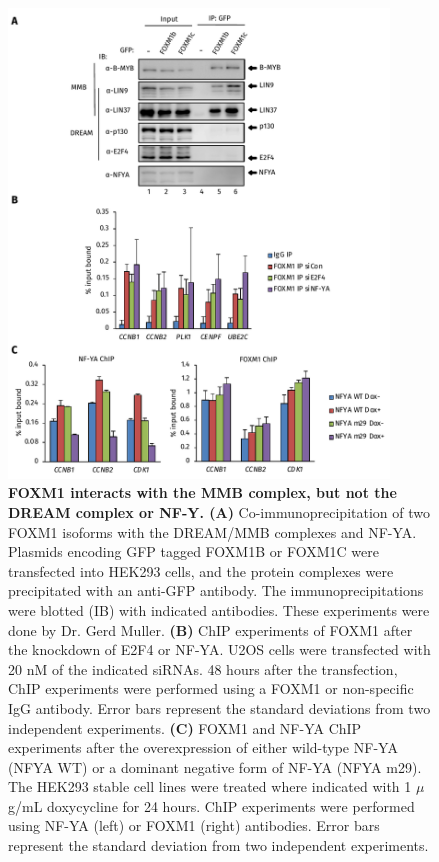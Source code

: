 \begin{figure}[!h]
    \centering
    \includegraphics[width=0.9\textwidth]{chapter3/figures_foxm1/fig26.pdf}
    \caption[FOXM1 interacts with the MMB complex, but not the DREAM complex or NF-Y]{\textbf{FOXM1 interacts with the MMB complex, but not the DREAM complex or NF-Y. (A)} Co-immunoprecipitation of two FOXM1 isoforms with the DREAM/MMB complexes and NF-YA. Plasmids encoding GFP tagged FOXM1B or FOXM1C were transfected into HEK293 cells, and the protein complexes were precipitated with an anti-GFP antibody. The immunoprecipitations were blotted (IB) with indicated antibodies. These experiments were done by Dr. Gerd Muller. \textbf{(B)} ChIP experiments of FOXM1 after the knockdown of E2F4 or NF-YA. U2OS cells were transfected with 20 nM of the indicated siRNAs. 48 hours after the transfection, ChIP experiments were performed using a FOXM1 or non-specific IgG antibody. Error bars represent the standard deviations from two independent experiments. \textbf{(C)} FOXM1 and NF-YA ChIP experiments after the overexpression of either wild-type NF-YA (NFYA WT) or a dominant negative form of NF-YA (NFYA m29). The HEK293 stable cell lines were treated where indicated with 1 $\mu$g/mL doxycycline for 24 hours. ChIP experiments were performed using NF-YA (left) or FOXM1 (right) antibodies. Error bars represent the standard deviation from two independent experiments.}
    \label{fig:fig26}
\end{figure}

